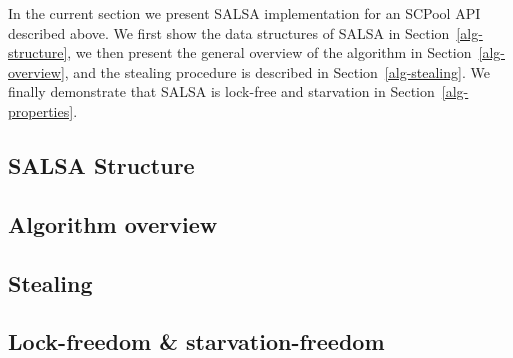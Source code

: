 In the current section we present SALSA implementation for an SCPool API described above.
We first show the data structures of SALSA in Section~\ref{alg-structure}, we then present the general overview 
of the algorithm in Section~\ref{alg-overview}, and the stealing procedure is described in Section~\ref{alg-stealing}. 
We finally demonstrate that SALSA is lock-free and starvation in Section~\ref{alg-properties}. 

\subsection{SALSA Structure\label{alg-structure}}

\subsection{Algorithm overview\label{alg-overview}}

\subsection{Stealing\label{alg-stealing}}
\subsection{Lock-freedom \& starvation-freedom\label{alg-properties}}